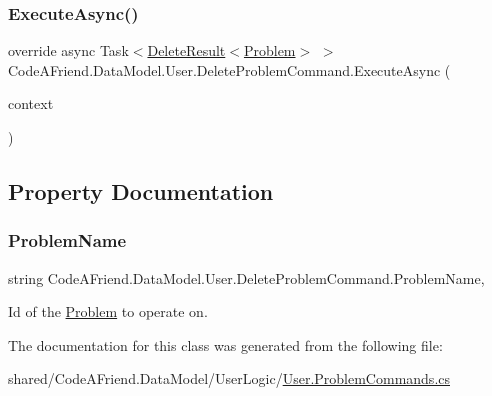 \subsubsection{\texorpdfstring{Execute\+Async()}{ExecuteAsync()}}
{\footnotesize\ttfamily override async Task$<$\mbox{\hyperlink{class_code_a_friend_1_1_data_model_1_1_delete_result}{Delete\+Result}}$<$\mbox{\hyperlink{class_code_a_friend_1_1_data_model_1_1_problem}{Problem}}$>$ $>$ Code\+A\+Friend.\+Data\+Model.\+User.\+Delete\+Problem\+Command.\+Execute\+Async (\begin{DoxyParamCaption}\item[{Db\+Context}]{context }\end{DoxyParamCaption})}







\subsection{Property Documentation}
\mbox{\label{class_code_a_friend_1_1_data_model_1_1_user_1_1_delete_problem_command_a220adc216f07aeed2119eb4dc946de21}} 
\subsubsection{\texorpdfstring{Problem\+Name}{ProblemName}}
{\footnotesize\ttfamily string Code\+A\+Friend.\+Data\+Model.\+User.\+Delete\+Problem\+Command.\+Problem\+Name\hspace{0.3cm}{\ttfamily [get]}, {\ttfamily [set]}}



Id of the \mbox{\hyperlink{class_code_a_friend_1_1_data_model_1_1_problem}{Problem}} to operate on.



The documentation for this class was generated from the following file\+:\begin{DoxyCompactItemize}
\item 
shared/\+Code\+A\+Friend.\+Data\+Model/\+User\+Logic/\mbox{\hyperlink{_user_8_problem_commands_8cs}{User.\+Problem\+Commands.\+cs}}\end{DoxyCompactItemize}
